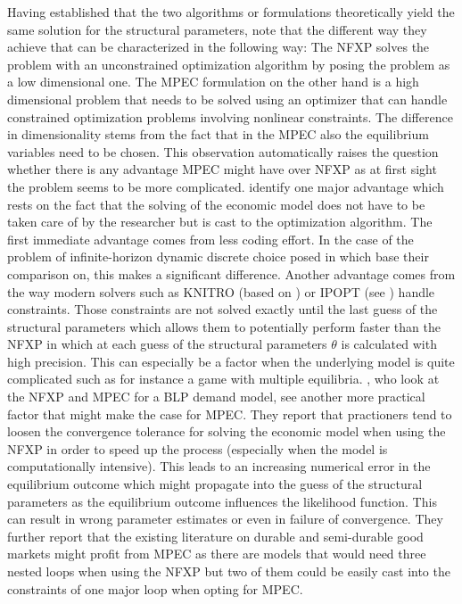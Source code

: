 Having established that the two algorithms or formulations theoretically yield the same solution for the structural parameters, \cite{Dong.Hsieh.Zhang.2017} note that the different way they achieve that can be characterized in the following way: The NFXP solves the problem with an unconstrained optimization algorithm by posing the problem as a low dimensional one. The MPEC formulation on the other hand is a high dimensional problem that needs to be solved using an optimizer that can handle constrained optimization problems involving nonlinear constraints. The difference in dimensionality stems from the fact that in the MPEC also the equilibrium variables need to be chosen. This observation automatically raises the question whether there is any advantage MPEC might have over NFXP as at first sight the problem seems to be more complicated. \cite{Su.Judd.2012} identify one major advantage which rests on the fact that the solving of the economic model does not have to be taken care of by the researcher but is cast to the optimization algorithm. The first immediate advantage comes from less coding effort. In the case of the problem of infinite-horizon dynamic discrete choice posed in \cite{Rust.1987} which \citeauthor{Su.Judd.2012} base their comparison on, this makes a significant difference. Another advantage comes from the way modern solvers such as KNITRO (based on \cite{Byrd.Nocedal.Waltz.2006}) or IPOPT (see \cite{Pirnay.Lopez-Negrete.Biegler.2011}) handle constraints. Those constraints are not solved exactly until the last guess of the structural parameters which allows them to potentially perform faster than the NFXP in which at each guess of the structural parameters $\theta$ is calculated with high precision. This can especially be a factor when the underlying model is quite complicated such as for instance a game with multiple equilibria. \cite{Dube.Fox.Su.2012}, who look at the NFXP and MPEC for a BLP demand model, see another more practical factor that might make the case for MPEC. They report that practioners tend to loosen the convergence tolerance for solving the economic model when using the NFXP in order to speed up the process (especially when the model is computationally intensive). This leads to an increasing numerical error in the equilibrium outcome which might propagate into the guess of the structural parameters as the equilibrium outcome influences the likelihood function. This can result in wrong parameter estimates or even in failure of convergence. They further report that the existing literature on durable and semi-durable good markets might profit from MPEC as there are models that would need three nested loops when using the NFXP but two of them could be easily cast into the constraints of one major loop when opting for MPEC. 

